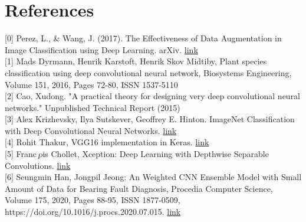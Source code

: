 \documentclass[11pt, oneside]{article}
\begin{document}
\section*{References}
[0] Perez, L., \& Wang, J. (2017). The Effectiveness of Data Augmentation in Image Classification using Deep Learning. arXiv. \href{https://doi.org/10.48550/arXiv.1712.04621}{link}\\
{[1]} Mads Dyrmann, Henrik Karstoft, Henrik Skov Midtiby, Plant species classification using deep convolutional neural network, Biosystems Engineering, Volume 151, 2016, Pages 72-80, ISSN 1537-5110 \\
{[2]} Cao, Xudong. "A practical theory for designing very deep convolutional neural networks." Unpublished Technical Report (2015) \\
{[3]} Alex Krizhevsky, Ilya Sutskever, Geoffrey E. Hinton. ImageNet Classification with Deep Convolutional Neural Networks. \href{https://proceedings.neurips.cc/paper/2012/file/c399862d3b9d6b76c8436e924a68c45b-Paper.pdf}{link} \\
{[4]} Rohit Thakur, VGG16 implementation in Keras. \href{https://towardsdatascience.com/step-by-step-vgg16-implementation-in-keras-for-beginners-a833c686ae6c}{link}\\
{[5]} Franc ̧ois Chollet, Xception: Deep Learning with Depthwise Separable Convolutions. \href{https://arxiv.org/pdf/1610.02357.pdf}{link}\\
{[6]} Seungmin Han, Jongpil Jeong:
An Weighted CNN Ensemble Model with Small Amount of Data for Bearing Fault Diagnosis, Procedia Computer Science,
Volume 175, 2020, Pages 88-95, ISSN 1877-0509, \\
https://doi.org/10.1016/j.procs.2020.07.015. \href{https://www.sciencedirect.com/science/article/pii/S187705092031694X}{link}
\end{document}
